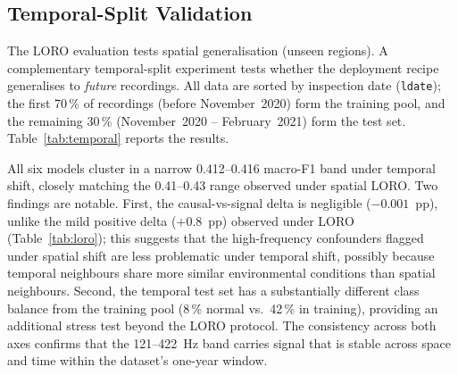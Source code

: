 \documentclass[3p,times,authoryear]{elsarticle}
\theoremstyle{remark}
\begin{document}
\subsection{Temporal-Split Validation}\label{sec:res-temporal}

The LORO evaluation tests spatial generalisation (unseen regions).
A complementary temporal-split experiment tests whether the
deployment recipe generalises to \emph{future} recordings. All
data are sorted by inspection date (\texttt{ldate}); the first
70\,\% of recordings (before November~2020) form the training
pool, and the remaining 30\,\% (November~2020 -- February~2021)
form the test set. Table~\ref{tab:temporal} reports the results.

\begin{table}[!htbp]
\caption{Temporal-split validation: train on pre-November~2020
recordings ($n{=}44{,}311$), test on post-November~2020
($n{=}21{,}150$). All models cluster in a narrow 0.41--0.42
macro-F1 band; the causal vs.\ signal delta is negligible
($-0.001$), confirming temporal stability of the 121--422~Hz
band.\label{tab:temporal}}
\centering
\scriptsize
\setlength{\tabcolsep}{3pt}
\end{table}

All six models cluster in a narrow 0.412--0.416 macro-F1 band
under temporal shift, closely matching the 0.41--0.43 range
observed under spatial LORO. Two findings are notable. First,
the causal-vs-signal delta is negligible ($-0.001$~pp), unlike
the mild positive delta ($+0.8$~pp) observed under LORO
(Table~\ref{tab:loro}); this suggests that the high-frequency
confounders flagged under spatial shift are less problematic
under temporal shift, possibly because temporal neighbours share
more similar environmental conditions than spatial neighbours.
Second, the temporal test set has a substantially different class
balance from the training pool (8\,\% normal vs.\ 42\,\% in
training), providing an additional stress test beyond the LORO
protocol. The consistency across both axes confirms that the
121--422~Hz band carries signal that is stable across space
and time within the dataset's one-year window.
\end{document}
